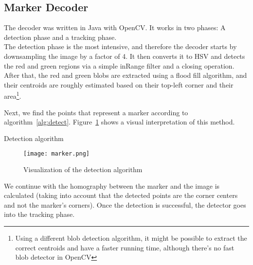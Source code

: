 \documentclass[DIV=calc, paper=a4, fontsize=11pt, twocolumn]{scrartcl}   %
\begin{document}
\subsection*{Marker Decoder}
The decoder was written in Java with OpenCV.
It works in two phases: A detection phase and a tracking phase.\\


The detection phase is the most intensive, and therefore the decoder starts by downsampling the image by a factor of 4. It then converts it to HSV and detects the red and green regions via a simple inRange filter and a closing operation.\\


After that, the red and green blobs are extracted using a flood fill algorithm, and their centroids are roughly estimated based on their top-left corner and their area\footnote{Using a different blob detection algorithm, it might be possible to extract the correct centroids and have a faster running time, although there's no fast blob detector in OpenCV}.


Next, we find the points that represent a marker according to algorithm~\ref{alg:detect}. Figure~\ref{fig:detect} shows a visual
interpretation of this method.

\begin{algorithm}
\caption{Detection algorithm}
\label{alg:detect}
\end{algorithm}

\begin{figure}[!h]
    \centering
    \texttt{[image: marker.png]}
    \caption{Visualization of the detection algorithm}
    \label{fig:detect}
\end{figure}

We continue with the homography between the marker and the image is calculated (taking into account that the detected points are the corner centers and not the marker's corners).
Once the detection is successful, the detector goes into the tracking phase.\\
\end{document}
